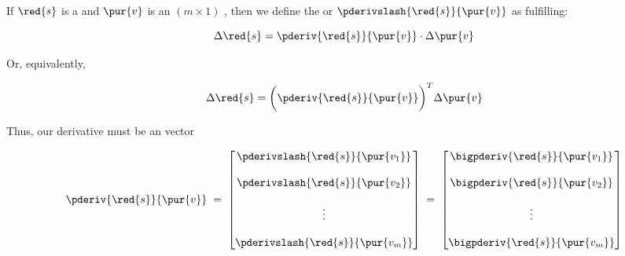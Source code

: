         \begin{definition}
            If $\red{s}$ is a  and $\pur{v}$ is an $(m \times 1)$ , then we define the  or  $\pderivslash{\red{s}}{\pur{v}}$ as fulfilling:
            
            \begin{equation*}
                \Delta \red{s}
                =
                \pderiv{\red{s}}{\pur{v}}
                \cdot
                \Delta \pur{v}
            \end{equation*}
            
            Or, equivalently,
            
            \begin{equation*}
                \Delta \red{s}
                =
                \bigg(
                    \pderiv{\red{s}}{\pur{v}}
                \bigg)^T
                \Delta \pur{v}
            \end{equation*}
            
            \boxdiv
            
            Thus, our derivative must be an  vector
            
            \begin{equation*}
                \pderiv{\red{s}}{\pur{v}}
                \;
                =
                \;
                \begin{bmatrix}
                    \pderivslash{\red{s}}   {\pur{v_1}}\\\\
                    \pderivslash{\red{s}}   {\pur{v_2}}\\\\
                    \vdots \\\\
                    \pderivslash{\red{s}}   {\pur{v_m}}
                \end{bmatrix}
                \;
                =
                \;
                \begin{bmatrix}
                    \bigpderiv{\red{s}}   {\pur{v_1}}\\ 
                    \\
                    \bigpderiv{\red{s}}   {\pur{v_2}}\\ 
                    \\
                    \vdots \\ 
                    \\
                    \bigpderiv{\red{s}}   {\pur{v_m}}
                \end{bmatrix}
            \end{equation*}
        \end{definition}
        

